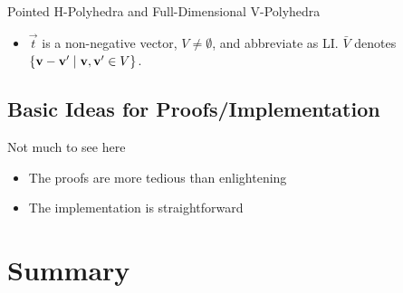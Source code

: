 \documentclass{beamer}
\begin{document}
\begin{frame}{Pointed H-Polyhedra and Full-Dimensional V-Polyhedra}
\begin{itemize}
  \item $\vec{t}$ is a non-negative vector, $V \neq \emptyset$, and abbreviate {\LI} as LI. $\bar V$ denotes $\{\mathbf{v}-\mathbf{v}'\;|\;\mathbf{v},\mathbf{v}'\in V\}$.\\

  \renewcommand{\arraystretch}{1.3}
\end{itemize}
\end{frame}

\subsection{Basic Ideas for Proofs/Implementation}

\begin{frame}{Not much to see here}
\begin{itemize}
  \item The proofs are more tedious than enlightening
  \item The implementation is straightforward
\end{itemize}
\end{frame}


\section*{Summary}
\end{document}
